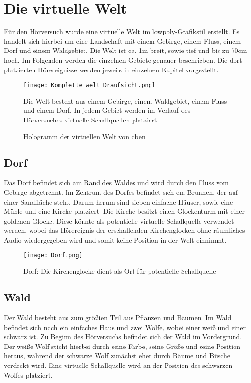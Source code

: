  \newpage
 
 \section{Die virtuelle Welt}
 
Für den Hörversuch wurde eine virtuelle Welt im lowpoly-Grafikstil erstellt. Es handelt sich hierbei um eine  Landschaft mit einem Gebirge, einem Fluss, einem Dorf und einem Waldgebiet. Die Welt ist ca. 1m breit, sowie tief und bis zu 70cm hoch. Im Folgenden werden die einzelnen Gebiete genauer beschrieben. Die dort platzierten Hörereignisse werden jeweils in einzelnen Kapitel vorgestellt. 
\vspace*{30pt}
 
 \begin{figure}[H]
\centering
\texttt{[image: Komplette\_welt\_Draufsicht.png]}
\caption{Hologramm der virtuellen Welt von oben}
Die Welt besteht aus einem Gebirge, einem Waldgebiet, einem Fluss und einem Dorf. In jedem Gebiet werden im Verlauf des Hörversuches virtuelle Schallquellen platziert.
\label{fig:Draufsicht}
\end{figure} 

\vspace*{40pt}
\subsection{Dorf}
Das Dorf befindet sich am Rand des Waldes und wird durch den Fluss vom Gebirge abgetrennt. Im Zentrum des Dorfes befindet sich ein Brunnen, der auf einer Sandfläche steht. Darum herum sind sieben einfache Häuser, sowie eine Mühle und eine Kirche platziert. Die Kirche besitzt einen Glockenturm mit einer goldenen Glocke. Diese könnte als potentielle virtuelle Schallquelle verwendet werden, wobei das Hörereignis der erschallenden Kirchenglocken ohne räumliches Audio wiedergegeben wird und somit keine Position in der Welt einnimmt. \\

 \begin{figure}[H]
\centering
\texttt{[image: Dorf.png]}
\caption{Dorf: Die Kirchenglocke dient als Ort für potentielle Schallquelle}
\label{fig:Dorf}
\end{figure} 

\subsection{Wald}
Der Wald besteht aus zum größten Teil aus Pflanzen und Bäumen. Im Wald befindet sich noch ein einfaches Haus und zwei Wölfe, wobei einer weiß und einer schwarz ist. Zu Beginn des Hörversuchs befindet sich der Wald im Vordergrund. Der weiße Wolf sticht hierbei durch seine Farbe, seine Größe und seine Position heraus, während der schwarze Wolf zunächst eher durch Bäume und Büsche verdeckt wird. Eine virtuelle Schallquelle wird an der Position des schwarzen Wolfes platziert. 

